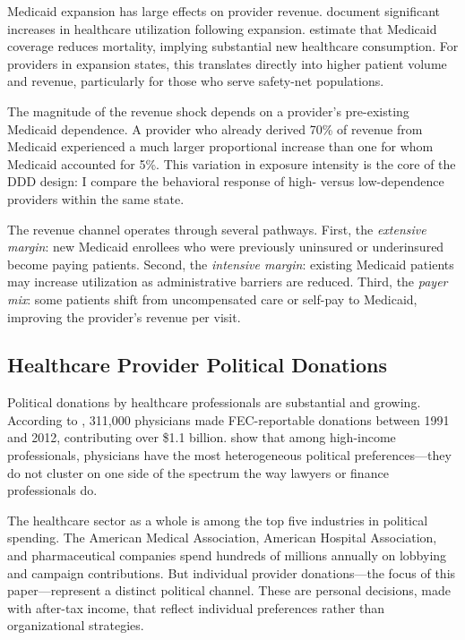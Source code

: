 \documentclass[12pt]{article}
\begin{document}
Medicaid expansion has large effects on provider revenue. \citet{sommers2017changes} document significant increases in healthcare utilization following expansion. \citet{miller2019medicaid} estimate that Medicaid coverage reduces mortality, implying substantial new healthcare consumption. For providers in expansion states, this translates directly into higher patient volume and revenue, particularly for those who serve safety-net populations.

The magnitude of the revenue shock depends on a provider's pre-existing Medicaid dependence. A provider who already derived 70\% of revenue from Medicaid experienced a much larger proportional increase than one for whom Medicaid accounted for 5\%. This variation in exposure intensity is the core of the DDD design: I compare the behavioral response of high- versus low-dependence providers within the same state.

The revenue channel operates through several pathways. First, the \textit{extensive margin}: new Medicaid enrollees who were previously uninsured or underinsured become paying patients. Second, the \textit{intensive margin}: existing Medicaid patients may increase utilization as administrative barriers are reduced. Third, the \textit{payer mix}: some patients shift from uncompensated care or self-pay to Medicaid, improving the provider's revenue per visit.

\subsection{Healthcare Provider Political Donations}

Political donations by healthcare professionals are substantial and growing. According to \citet{bonica2014political}, 311,000 physicians made FEC-reportable donations between 1991 and 2012, contributing over \$1.1 billion. \citet{bonica2015professional} show that among high-income professionals, physicians have the most heterogeneous political preferences---they do not cluster on one side of the spectrum the way lawyers or finance professionals do.

The healthcare sector as a whole is among the top five industries in political spending. The American Medical Association, American Hospital Association, and pharmaceutical companies spend hundreds of millions annually on lobbying and campaign contributions. But individual provider donations---the focus of this paper---represent a distinct political channel. These are personal decisions, made with after-tax income, that reflect individual preferences rather than organizational strategies.
\end{document}
